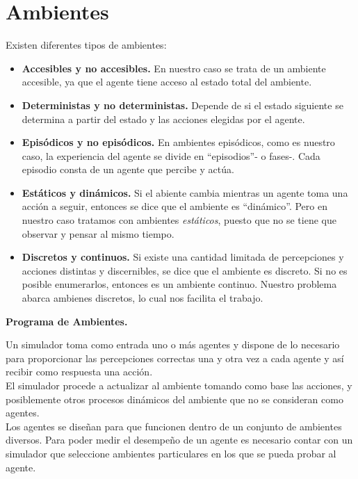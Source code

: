 \documentclass[a4paper,12pt,oneside]{book}
\begin{document}
\section{Ambientes}
Existen diferentes tipos de ambientes:
\begin{itemize}
\item {\bf Accesibles y no accesibles.} En nuestro caso se trata de un
  ambiente accesible, ya que el agente tiene acceso al estado total
  del ambiente.
\item {\bf Deterministas y no deterministas.} Depende de si el estado
  siguiente se determina a partir del estado y las acciones elegidas
  por el agente.
\item {\bf Episódicos y no episódicos.} En ambientes episódicos, como
  es nuestro caso, la experiencia del agente se divide en
  ``episodios''- o fases-. Cada episodio consta de un agente que
  percibe y actúa.
\item {\bf Estáticos y dinámicos.} Si el abiente cambia mientras un
  agente toma una acción a seguir, entonces se dice que el ambiente es
  ``dinámico''. Pero en nuestro caso tratamos con ambientes {\it
    estáticos}, puesto que no se tiene que observar y pensar al mismo tiempo.
\item {\bf Discretos y continuos.} Si existe una cantidad limitada de
  percepciones y acciones distintas y discernibles, se dice que el
  ambiente es discreto. Si no es posible enumerarlos, entonces es un
  ambiente continuo. Nuestro problema abarca ambienes discretos, lo
  cual nos facilita el trabajo.
\end{itemize}

{\bf Programa de Ambientes.}


Un simulador toma como entrada uno o más agentes y dispone de lo
necesario para proporcionar las percepciones correctas una y otra vez
a cada agente y así recibir como respuesta una acción.\\

El simulador procede a actualizar  al ambiente tomando como base las
acciones, y posiblemente otros procesos dinámicos del ambiente que no
se consideran como agentes.\\

Los agentes se diseñan para que funcionen dentro de un conjunto de
ambientes diversos. Para poder medir el desempeño de un agente es
necesario contar con un simulador que seleccione ambientes
particulares en los que se pueda probar al agente.
\end{document}
